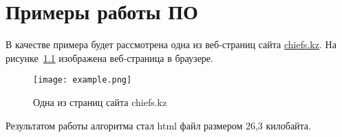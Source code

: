 \chapter{Примеры работы ПО}

В качестве примера будет рассмотрена одна из веб-страниц сайта \url{chiefs.kz}. На рисунке~\ref{examplepage} изображена веб-страница в браузере.

\begin{figure}[h!]
    \texttt{[image: example.png]}
    \caption{Одна из страниц сайта chiefs.kz}
    \label{examplepage}
\end{figure}

Результатом работы алгоритма стал html файл размером 26,3 килобайта.
